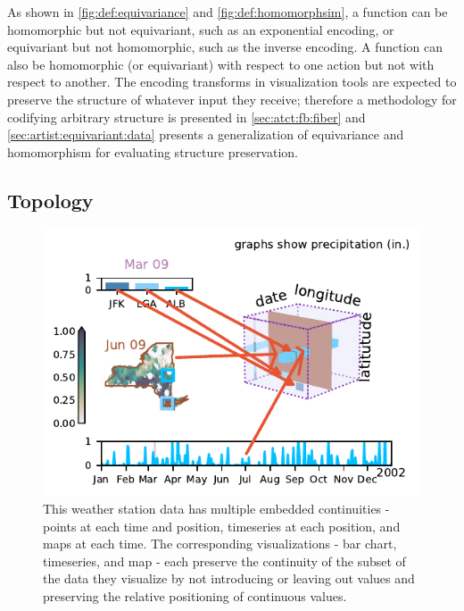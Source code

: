 \documentclass[journal]{IEEEtran}
\theoremstyle{definition}
\theoremstyle{remark}
\begin{document}
As shown in \autoref{fig:def:equivariance} and \autoref{fig:def:homomorphsim}, a function can be homomorphic but not equivariant, such as an exponential encoding, or equivariant but not homomorphic, such as the inverse encoding. A function can also be homomorphic (or equivariant) with respect to one action but not with respect to another. The encoding transforms in visualization tools are expected to preserve the structure of whatever input they receive; therefore a methodology for codifying arbitrary structure is presented in \autoref{sec:atct:fb:fiber} and \autoref{sec:artist:equivariant:data} presents a generalization of equivariance and homomorphism for evaluating structure preservation.

\subsection{Topology}
\label{sec:related-work:continuity}

\begin{figure}[H]
  \includegraphics[width=1\columnwidth]{k_different_types.pdf}
  \caption{This weather station data has multiple embedded continuities - points at each time and position, timeseries at each position, and maps at each time. The corresponding visualizations - bar chart, timeseries, and map - each preserve the continuity of the subset of the data they visualize by not introducing or leaving out values and preserving the relative positioning of continuous values.}
%
  \label{fig:related-work:continuity:ktypes}
\end{figure}
\end{document}
